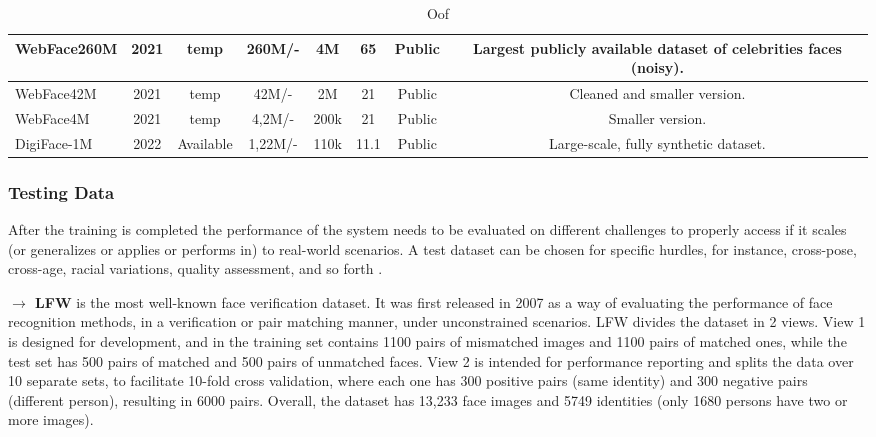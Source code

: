 \documentclass[class=report, crop=false, a4paper, 12pt]{standalone}
\begin{document}
\begin{table}[!ht]
{\begin{tabular}{|l|c|c|c|c|c|c|c|}
    WebFace260M \autocite{zhuWebFace260MBenchmarkUnveiling2021}                            & 2021          & temp                  & 260M/-                 & 4M             & 65                    & Public                & Largest publicly available dataset of celebrities faces (noisy).                 \\ \hline
    WebFace42M \autocite{zhuWebFace260MBenchmarkUnveiling2021}                             & 2021          & temp                  & 42M/-                  & 2M             & 21                    & Public                & Cleaned and smaller version.                 \\ \hline
    WebFace4M \autocite{zhuWebFace260MBenchmarkUnveiling2021}                              & 2021          & temp                  & 4,2M/-                 & 200k           & 21                    & Public                & Smaller version.                 \\ \hline
    DigiFace-1M \autocite{baeDigiFace1MMillionDigital2023}                            & 2022          & Available                  & 1,22M/-                & 110k           & 11.1                  & Public                & Large-scale, fully synthetic dataset.                 \\ \hline
    \end{tabular}%
    }
    \caption{Oof}
    \label{tab:training data}
\end{table}
\newpage
\subsubsection{\large Testing Data}

\par After the training is completed the performance of the system needs to be evaluated on different challenges to properly access if it scales (or generalizes or applies or performs in) to real-world scenarios. A test dataset can be chosen for specific hurdles, for instance, cross-pose, cross-age, racial variations, quality assessment, and so forth \autocite{duElementsEndtoendDeep2022}.


\vspace{0.7\baselineskip}
\noindent\textbf{$\rightarrow$ LFW} \autocite{huangLabeledFacesWild} is the most well-known face verification dataset. It was first released in 2007 as a way of evaluating the performance of face recognition methods, in a verification or pair matching manner, under unconstrained scenarios. LFW divides the dataset in 2 views. View 1 is designed for development, and in the training set contains 1100 pairs of mismatched images and 1100 pairs of matched ones, while the test set has 500 pairs of matched and 500 pairs of unmatched faces. View 2 is intended for performance reporting and splits the data over 10 separate sets, to facilitate 10-fold cross validation, where each one has 300 positive pairs (same identity) and 300 negative pairs (different person), resulting in 6000 pairs. Overall, the dataset has 13,233 face images and 5749 identities (only 1680 persons have two or more images).
\end{document}
